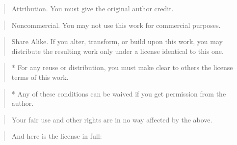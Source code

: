 \begin{quote}
Attribution. You must give the original author credit.
\end{quote}
\begin{quote}
Noncommercial. You may not use this work for commercial purposes.
\end{quote}
\begin{quote}
Share Alike. If you alter, transform, or build upon this work, you
may distribute the resulting work only under a license identical to
this one.
\end{quote}
\begin{quote}
* For any reuse or distribution, you must make clear to others the
license terms of this work.
\end{quote}
\begin{quote}
* Any of these conditions can be waived if you get permission from
the author.
\end{quote}
\begin{quote}
Your fair use and other rights are in no way affected by the above.
\end{quote}
\begin{quote}
And here is the license in full:
\end{quote}
